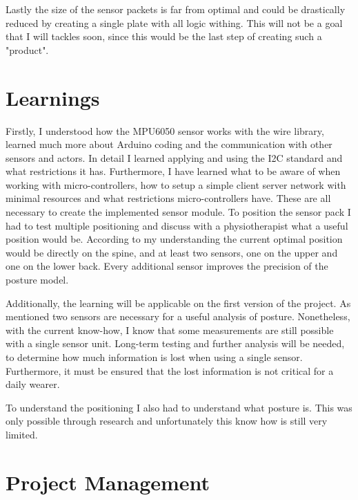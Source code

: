 Lastly the size of the sensor packets is far from optimal and could be drastically reduced by creating a single plate with all logic withing. This will not be a goal that I will tackles soon, since this would be the last step of creating such a "product".


\section{Learnings}

Firstly, I understood how the MPU6050 sensor works with the wire library, learned much more about Arduino coding and the communication with other sensors and actors. In detail I learned applying and using the I2C standard and what restrictions it has.
Furthermore, I have learned what to be aware of when working with micro-controllers, how to setup a simple client server network with minimal resources and what restrictions micro-controllers have. These are all necessary to create the implemented sensor module. 
To position the sensor pack I had to test multiple positioning and discuss with a physiotherapist what a useful position would be. According to my understanding the current optimal position would be directly on the spine, and at least two sensors, one on the upper and one on the lower back. Every additional sensor improves the precision of the posture model. 

Additionally, the learning will be applicable on the first version of the project. As mentioned two sensors are necessary for a useful analysis of posture. Nonetheless, with the current know-how, I know that some measurements are still possible with a single sensor unit. Long-term testing and further analysis will be needed, to determine how much information is lost when using a single sensor. Furthermore, it must be ensured that the lost information is not critical for a daily wearer.

To understand the positioning I also had to understand what posture is. This was only possible through research and unfortunately this know how is still very limited.

\section{Project Management}

